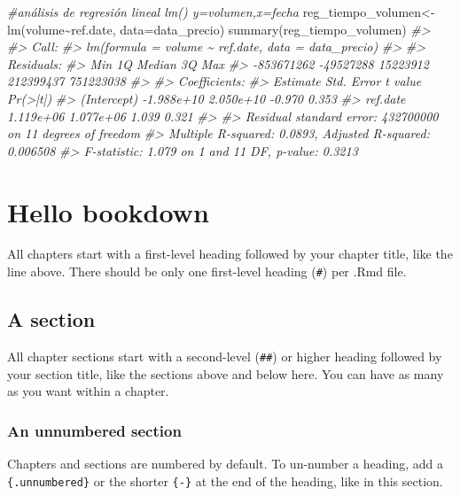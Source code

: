 \documentclass[
]{book}
\newenvironment{Shaded}{\begin{snugshade}}{\end{snugshade}}
\newcommand{\AttributeTok}[1]{\textcolor[rgb]{0.77,0.63,0.00}{#1}}
\newcommand{\CommentTok}[1]{\textcolor[rgb]{0.56,0.35,0.01}{\textit{#1}}}
\newcommand{\FunctionTok}[1]{\textcolor[rgb]{0.00,0.00,0.00}{#1}}
\newcommand{\NormalTok}[1]{#1}
\newcommand{\OtherTok}[1]{\textcolor[rgb]{0.56,0.35,0.01}{#1}}
\newcommand{\SpecialCharTok}[1]{\textcolor[rgb]{0.00,0.00,0.00}{#1}}
\begin{document}
\begin{Shaded}
\begin{Highlighting}[]
\CommentTok{\#análisis de regresión lineal lm() y=volumen,x=fecha}
\NormalTok{reg\_tiempo\_volumen}\OtherTok{\textless{}{-}}\FunctionTok{lm}\NormalTok{(volume}\SpecialCharTok{\textasciitilde{}}\NormalTok{ref.date, }\AttributeTok{data=}\NormalTok{data\_precio)}
\FunctionTok{summary}\NormalTok{(reg\_tiempo\_volumen)}
\CommentTok{\#\textgreater{} }
\CommentTok{\#\textgreater{} Call:}
\CommentTok{\#\textgreater{} lm(formula = volume \textasciitilde{} ref.date, data = data\_precio)}
\CommentTok{\#\textgreater{} }
\CommentTok{\#\textgreater{} Residuals:}
\CommentTok{\#\textgreater{}        Min         1Q     Median         3Q        Max }
\CommentTok{\#\textgreater{} {-}853671262  {-}49527288   15223912  212399437  751223038 }
\CommentTok{\#\textgreater{} }
\CommentTok{\#\textgreater{} Coefficients:}
\CommentTok{\#\textgreater{}               Estimate Std. Error t value Pr(\textgreater{}|t|)}
\CommentTok{\#\textgreater{} (Intercept) {-}1.988e+10  2.050e+10  {-}0.970    0.353}
\CommentTok{\#\textgreater{} ref.date     1.119e+06  1.077e+06   1.039    0.321}
\CommentTok{\#\textgreater{} }
\CommentTok{\#\textgreater{} Residual standard error: 432700000 on 11 degrees of freedom}
\CommentTok{\#\textgreater{} Multiple R{-}squared:  0.0893, Adjusted R{-}squared:  0.006508 }
\CommentTok{\#\textgreater{} F{-}statistic: 1.079 on 1 and 11 DF,  p{-}value: 0.3213}
\end{Highlighting}
\end{Shaded}

\hypertarget{hello-bookdown}{%
\chapter{Hello bookdown}\label{hello-bookdown}}

All chapters start with a first-level heading followed by your chapter title, like the line above. There should be only one first-level heading (\texttt{\#}) per .Rmd file.

\hypertarget{a-section}{%
\section{A section}\label{a-section}}

All chapter sections start with a second-level (\texttt{\#\#}) or higher heading followed by your section title, like the sections above and below here. You can have as many as you want within a chapter.

\hypertarget{an-unnumbered-section}{%
\subsection*{An unnumbered section}\label{an-unnumbered-section}}

Chapters and sections are numbered by default. To un-number a heading, add a \texttt{\{.unnumbered\}} or the shorter \texttt{\{-\}} at the end of the heading, like in this section.

  
\end{document}
